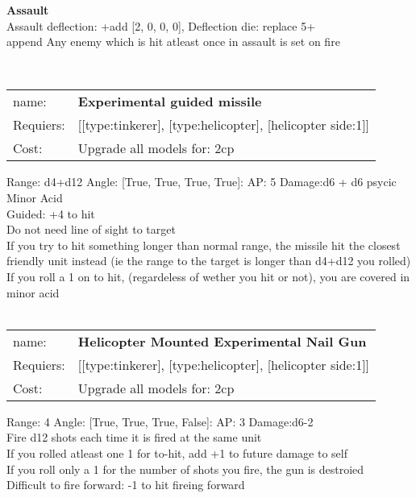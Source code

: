 {\bf Assault} \ \\
Assault deflection: +add [2, 0, 0, 0], Deflection die: replace 5+
\\ 

append Any enemy which is hit atleast once in assault is set on fire


\ \\
\begin{tabular}{ll}
name: & {\bf Experimental guided missile } \\
Requiers: & [[type:tinkerer], [type:helicopter], [helicopter side:1]] \\
Cost: & Upgrade all models for: 2cp \\
\end{tabular}



Range: d4+d12  Angle: [True, True, True, True]: AP: 5 Damage:d6 + d6 psycic \\
Minor Acid\\ 
Guided: +4 to hit\\ 
Do not need line of sight to target\\ 
If you try to hit something longer than normal range, the missile hit the closest friendly unit instead (ie the range to the target is longer than d4+d12 you rolled)\\ 
If you roll a 1 on to hit, (regardeless of wether you hit or not), you are covered in minor acid\\ 








\ \\
\begin{tabular}{ll}
name: & {\bf Helicopter Mounted Experimental Nail Gun } \\
Requiers: & [[type:tinkerer], [type:helicopter], [helicopter side:1]] \\
Cost: & Upgrade all models for: 2cp \\
\end{tabular}



Range: 4  Angle: [True, True, True, False]: AP: 3 Damage:d6-2 \\
Fire d12 shots each time it is fired at the same unit\\ 
If you rolled atleast one 1 for to-hit, add +1 to future damage to self\\ 
If you roll only a 1 for the number of shots you fire, the gun is destroied\\ 
Difficult to fire forward: -1 to hit fireing forward\\ 








